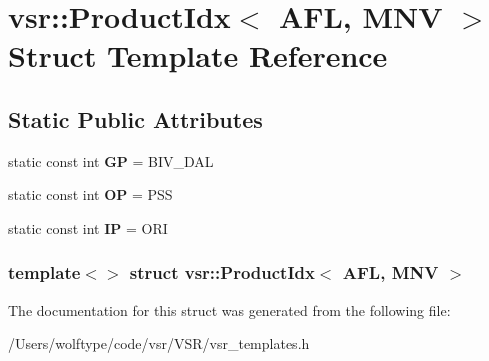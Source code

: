 \hypertarget{structvsr_1_1_product_idx_3_01_a_f_l_00_01_m_n_v_01_4}{\section{vsr\-:\-:Product\-Idx$<$ A\-F\-L, M\-N\-V $>$ Struct Template Reference}
\label{structvsr_1_1_product_idx_3_01_a_f_l_00_01_m_n_v_01_4}
}
\subsection*{Static Public Attributes}
\begin{DoxyCompactItemize}
\item 
\hypertarget{structvsr_1_1_product_idx_3_01_a_f_l_00_01_m_n_v_01_4_ad32508a5156a344191985cbcc03ecf89}{static const int {\bfseries G\-P} = B\-I\-V\-\_\-\-D\-A\-L}\label{structvsr_1_1_product_idx_3_01_a_f_l_00_01_m_n_v_01_4_ad32508a5156a344191985cbcc03ecf89}

\item 
\hypertarget{structvsr_1_1_product_idx_3_01_a_f_l_00_01_m_n_v_01_4_a81753ddeadffe605ad6b7a05e4d20801}{static const int {\bfseries O\-P} = P\-S\-S}\label{structvsr_1_1_product_idx_3_01_a_f_l_00_01_m_n_v_01_4_a81753ddeadffe605ad6b7a05e4d20801}

\item 
\hypertarget{structvsr_1_1_product_idx_3_01_a_f_l_00_01_m_n_v_01_4_a460a227fc37e69a6050824d2001031a6}{static const int {\bfseries I\-P} = O\-R\-I}\label{structvsr_1_1_product_idx_3_01_a_f_l_00_01_m_n_v_01_4_a460a227fc37e69a6050824d2001031a6}

\end{DoxyCompactItemize}
\subsubsection*{template$<$$>$ struct vsr\-::\-Product\-Idx$<$ A\-F\-L, M\-N\-V $>$}



The documentation for this struct was generated from the following file\-:\begin{DoxyCompactItemize}
\item 
/\-Users/wolftype/code/vsr/\-V\-S\-R/vsr\-\_\-templates.\-h\end{DoxyCompactItemize}
